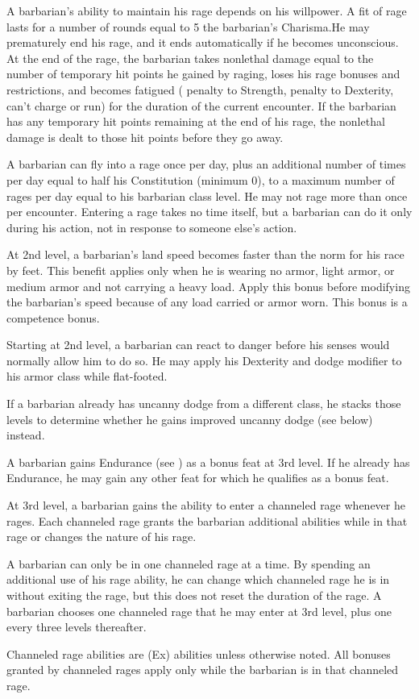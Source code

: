 \par A barbarian's ability to maintain his rage depends on his willpower. A fit of rage lasts for a number of rounds equal to 5 \add the barbarian's Charisma.He may prematurely end his rage, and it ends automatically if he becomes unconscious. At the end of the rage, the barbarian takes nonlethal damage equal to the number of temporary hit points he gained by raging, loses his rage bonuses and restrictions, and becomes fatigued ( penalty to Strength,  penalty to Dexterity, can't charge or run) for the duration of the current encounter.  If the barbarian has any temporary hit points remaining at the end of his rage, the nonlethal damage is dealt to those hit points before they go away.

\par A barbarian can fly into a rage once per day, plus an additional number of times per day equal to half his Constitution (minimum 0), to a maximum number of rages per day equal to his barbarian class level. He may not rage more than once per encounter. Entering a rage takes no time itself, but a barbarian can do it only during his action, not in response to someone else's action.

 At 2nd level, a barbarian's land speed becomes faster than the norm for his race by  feet. This benefit applies only when he is wearing no armor, light armor, or medium  armor and not carrying a heavy load. Apply this bonus before modifying the barbarian's speed because of any load carried or armor worn. This bonus is a competence bonus.

 Starting at 2nd level, a barbarian can react to danger before his senses would normally allow him to do so. He may apply his Dexterity and dodge modifier to his armor class while flat-footed.

If a barbarian already has uncanny dodge from a different class, he stacks those levels to determine whether he gains improved uncanny dodge (see below) instead.

 A barbarian gains Endurance (see ) as a bonus feat at 3rd level. If he already has Endurance, he may gain any other feat for which he qualifies as a bonus feat.

 At 3rd level, a barbarian gains the ability to enter a channeled rage whenever he rages. Each channeled rage grants the barbarian additional abilities while in that rage or changes the nature of his rage.
\par A barbarian can only be in one channeled rage at a time. By spending an additional use of his rage ability, he can change which channeled rage he is in without exiting the rage, but this does not reset the duration of the rage. A barbarian chooses one channeled rage that he may enter at 3rd level, plus one every three levels thereafter.
\par Channeled rage abilities are (Ex) abilities unless otherwise noted. All bonuses granted by channeled rages apply only while the barbarian is in that channeled rage.

